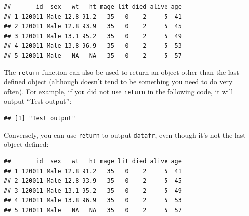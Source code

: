 \documentclass[]{book}
\makeatletter
\newenvironment{Shaded}{\begin{snugshade}}{\end{snugshade}}
\newcommand{\KeywordTok}[1]{\textcolor[rgb]{0.13,0.29,0.53}{\textbf{{#1}}}}
\newcommand{\DataTypeTok}[1]{\textcolor[rgb]{0.13,0.29,0.53}{{#1}}}
\newcommand{\StringTok}[1]{\textcolor[rgb]{0.31,0.60,0.02}{{#1}}}
\newcommand{\NormalTok}[1]{{#1}}
\newenvironment{kframe}{%
\medskip{}
\setlength{\fboxsep}{.8em}
 \def\at@end@of@kframe{}%
 \ifinner\ifhmode%
  \def\at@end@of@kframe{\end{minipage}}%
  \begin{minipage}{\columnwidth}%
 \fi\fi%
 \def\FrameCommand##1{\hskip\@totalleftmargin \hskip-\fboxsep
 \colorbox{shadecolor}{##1}\hskip-\fboxsep
     \hskip-\linewidth \hskip-\@totalleftmargin \hskip\columnwidth}%
 \MakeFramed {\advance\hsize-\width
   \@totalleftmargin\z@ \linewidth\hsize
   \@setminipage}}%
 {\par\unskip\endMakeFramed%
 \at@end@of@kframe}
\renewenvironment{Shaded}{\begin{kframe}}{\end{kframe}}
\makeatother
\begin{document}
\begin{verbatim}
##       id  sex   wt   ht mage lit died alive age
## 1 120011 Male 12.8 91.2   35   0    2     5  41
## 2 120011 Male 12.8 93.9   35   0    2     5  45
## 3 120011 Male 13.1 95.2   35   0    2     5  49
## 4 120011 Male 13.8 96.9   35   0    2     5  53
## 5 120011 Male   NA   NA   35   0    2     5  57
\end{verbatim}

The \texttt{return} function can also be used to return an object other
than the last defined object (although doesn't tend to be something you
need to do very often). For example, if you did not use \texttt{return}
in the following code, it will output ``Test output'':

\begin{Shaded}
\end{Shaded}

\begin{verbatim}
## [1] "Test output"
\end{verbatim}

Conversely, you can use \texttt{return} to output \texttt{datafr}, even
though it's not the last object defined:

\begin{Shaded}
\end{Shaded}

\begin{verbatim}
##       id  sex   wt   ht mage lit died alive age
## 1 120011 Male 12.8 91.2   35   0    2     5  41
## 2 120011 Male 12.8 93.9   35   0    2     5  45
## 3 120011 Male 13.1 95.2   35   0    2     5  49
## 4 120011 Male 13.8 96.9   35   0    2     5  53
## 5 120011 Male   NA   NA   35   0    2     5  57
\end{verbatim}
\end{document}
